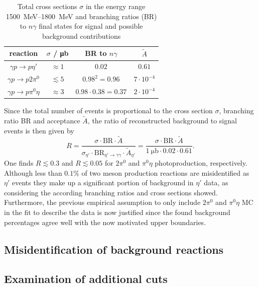 \begin{table}[htbp]
	\centering
	\begin{tabular}{cccc}
		\toprule
		reaction & $\sigma$ / \si{\micro\barn} & BR to $n\gamma$ & $\tilde{A}$\\
		\hline
		$\gamma p\to p\eta'$ &$\approx1$ \cite{etap_cs}& $0.02$ & $0.61$\\
		$\gamma p\to p2\pi^0$ &$\lesssim5$ \cite{2pi0_cs}&$0.98^2=0.96$& $7\cdot 10^{-4}$\\
		$\gamma p\to p\pi^0\eta$ &$\approx3$ \cite{pi0eta_cs} &$0.98\cdot0.38=0.37$&$2\cdot 10^{-4}$\\
		\bottomrule 		
	\end{tabular}
\caption{Total cross sections $\sigma$ in the energy range \SIrange{1500}{1800}{\mega\eV} and branching ratios (BR) to $n\gamma$ final states for signal and possible background contributions}
\label{tab:plausmc}
\end{table}


Since the total number of events is proportional to the cross section $\sigma$, branching ratio BR and acceptance $\tilde{A}$, the ratio of reconstructed background to signal events is then given by $$R=\frac{\sigma\cdot\text{BR}\cdot\tilde{A}}{\sigma_{\eta'}\cdot\text{BR}_{\eta'\to\gamma\gamma}\cdot\tilde{A}_{\eta'}}=\frac{\sigma\cdot\text{BR}\cdot\tilde{A}}{\SI{1}{\micro\barn}\cdot0.02\cdot0.61}.$$
One finds $R\lesssim0.3$ and $R\lesssim0.05$ for $2\pi^0$ and $\pi^0\eta$ photoproduction, respectively. Although less than $0.1\%$ of two meson production reactions are misidentified as $\eta'$ events they make up a significant portion of background in $\eta'$ data, as considering the according branching ratios and cross sections showed. Furthermore, the previous empirical assumption to only include $2\pi^0$ and $\pi^0\eta$ MC in the fit to describe the data is now justified since the found background percentages agree well with the now motivated upper boundaries.    

\subsection{Misidentification of background reactions}
\subsection{Examination of additional cuts}

